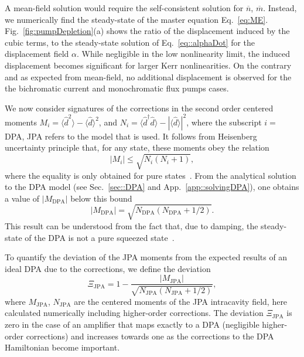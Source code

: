 \documentclass[pra,twocolumn,superscriptaddress]{revtex4-1}
\newcommand{\dhat}[0]{\hat{d}}
\newcommand{\parO}[1]{\left(#1\right)}
\newcommand{\abs}[1]{\left|#1\right|}
\begin{document}
A mean-field solution would require the self-consistent solution for $\overline{n}$, $\overline{m}$.
Instead, we numerically find the steady-state of the master equation Eq.~\eqref{eq:ME}.
% 
Fig.~\ref{fig:pumpDepletion}(a) shows the ratio of the displacement induced by the cubic terms, to the steady-state solution of Eq.~\eqref{eq::alphaDot} for the displacement field $\alpha$. While negligible in the low nonlinearity limit, the induced displacement becomes significant for larger Kerr nonlinearities. 
%
On the contrary and as expected from mean-field, no additional displacement is observed for the the bichromatic current and monochromatic flux pumps cases. 

We now consider signatures of the corrections in the second order centered moments $M_i = \langle \dhat^2 \rangle- \langle \dhat\rangle^2  $, and
 $N_i = \langle \dhat^\dag \dhat \rangle- |\langle \dhat \rangle|^2  $, where the subscript $i = $ DPA, JPA refers to the model that is used.
 It follows from Heisenberg uncertainty principle that, for any state, these moments obey the relation
 \begin{equation}
 	\abs{M_i} \leq \sqrt{N_i(N_i+1)},
 	\label{eq:MN}
 \end{equation}
 where the equality is only obtained for pure states~\cite{Gardiner:2004fk}.
From the analytical solution to the DPA model (see Sec.~\ref{sec::DPA} and App.~\ref{app::solvingDPA}), one obtains a value of $|M_{\mathrm{DPA}}|$ below this bound
 \begin{equation}
 	\abs{M_{\mathrm{DPA}}} = \sqrt{N_{\mathrm{DPA}} \parO{N_{\mathrm{DPA}}+1/2
 	}}.
 \end{equation}
 This result can be understood from the fact that, due to damping, the steady-state of the DPA is not a pure squeezed state~\cite{Collett:1984kl}.


 To quantify the deviation of the JPA moments from the expected results of an ideal DPA due to the corrections, we define the deviation
\begin{equation}
 	\Xi_{\mathrm{JPA}} 
 	= 1- \frac{\abs{M_{\mathrm{JPA}}}}{\sqrt{N_{\mathrm{JPA}}\parO{N_{\mathrm{JPA}}+1/2}}},
 	\label{eq:SigmaDPA}
 \end{equation}
where $M_{\mathrm{JPA}}$, $N_{\mathrm{JPA}}$ are the centered moments of the JPA intracavity field, here calculated numerically including higher-order corrections.
% 
The deviation $\Xi_{\mathrm{JPA}}$ is zero in the case of an amplifier that maps exactly to a DPA (negligible higher-order corrections) and increases towards one as the corrections to the DPA Hamiltonian become important.
\end{document}
